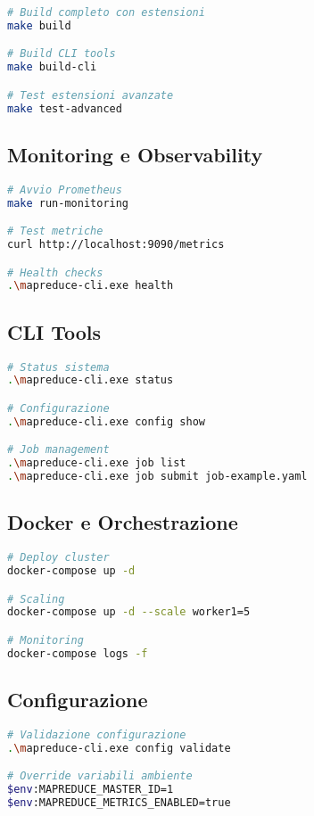 \documentclass[12pt,a4paper]{article}
\begin{document}
\begin{lstlisting}[language=bash]
# Build completo con estensioni
make build

# Build CLI tools
make build-cli

# Test estensioni avanzate
make test-advanced
\end{lstlisting}

\subsection{Monitoring e Observability}

\begin{lstlisting}[language=bash]
# Avvio Prometheus
make run-monitoring

# Test metriche
curl http://localhost:9090/metrics

# Health checks
.\mapreduce-cli.exe health
\end{lstlisting}

\subsection{CLI Tools}

\begin{lstlisting}[language=bash]
# Status sistema
.\mapreduce-cli.exe status

# Configurazione
.\mapreduce-cli.exe config show

# Job management
.\mapreduce-cli.exe job list
.\mapreduce-cli.exe job submit job-example.yaml
\end{lstlisting}

\subsection{Docker e Orchestrazione}

\begin{lstlisting}[language=bash]
# Deploy cluster
docker-compose up -d

# Scaling
docker-compose up -d --scale worker1=5

# Monitoring
docker-compose logs -f
\end{lstlisting}

\subsection{Configurazione}

\begin{lstlisting}[language=bash]
# Validazione configurazione
.\mapreduce-cli.exe config validate

# Override variabili ambiente
$env:MAPREDUCE_MASTER_ID=1
$env:MAPREDUCE_METRICS_ENABLED=true
\end{lstlisting}
\end{document}
